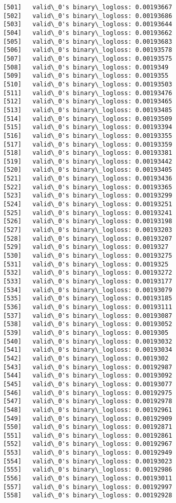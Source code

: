 \documentclass[11pt]{article}
\begin{document}
\begin{Verbatim}[commandchars=\\\{\}]
[501]	valid\_0's binary\_logloss: 0.00193667
[502]	valid\_0's binary\_logloss: 0.00193686
[503]	valid\_0's binary\_logloss: 0.00193644
[504]	valid\_0's binary\_logloss: 0.00193662
[505]	valid\_0's binary\_logloss: 0.00193683
[506]	valid\_0's binary\_logloss: 0.00193578
[507]	valid\_0's binary\_logloss: 0.00193575
[508]	valid\_0's binary\_logloss: 0.0019349
[509]	valid\_0's binary\_logloss: 0.0019355
[510]	valid\_0's binary\_logloss: 0.00193503
[511]	valid\_0's binary\_logloss: 0.00193476
[512]	valid\_0's binary\_logloss: 0.00193465
[513]	valid\_0's binary\_logloss: 0.00193485
[514]	valid\_0's binary\_logloss: 0.00193509
[515]	valid\_0's binary\_logloss: 0.00193394
[516]	valid\_0's binary\_logloss: 0.00193355
[517]	valid\_0's binary\_logloss: 0.00193359
[518]	valid\_0's binary\_logloss: 0.00193381
[519]	valid\_0's binary\_logloss: 0.00193442
[520]	valid\_0's binary\_logloss: 0.00193405
[521]	valid\_0's binary\_logloss: 0.00193436
[522]	valid\_0's binary\_logloss: 0.00193365
[523]	valid\_0's binary\_logloss: 0.00193299
[524]	valid\_0's binary\_logloss: 0.00193251
[525]	valid\_0's binary\_logloss: 0.00193241
[526]	valid\_0's binary\_logloss: 0.00193198
[527]	valid\_0's binary\_logloss: 0.00193203
[528]	valid\_0's binary\_logloss: 0.00193207
[529]	valid\_0's binary\_logloss: 0.0019327
[530]	valid\_0's binary\_logloss: 0.00193275
[531]	valid\_0's binary\_logloss: 0.0019325
[532]	valid\_0's binary\_logloss: 0.00193272
[533]	valid\_0's binary\_logloss: 0.00193177
[534]	valid\_0's binary\_logloss: 0.00193079
[535]	valid\_0's binary\_logloss: 0.00193185
[536]	valid\_0's binary\_logloss: 0.00193111
[537]	valid\_0's binary\_logloss: 0.00193087
[538]	valid\_0's binary\_logloss: 0.00193052
[539]	valid\_0's binary\_logloss: 0.0019305
[540]	valid\_0's binary\_logloss: 0.00193032
[541]	valid\_0's binary\_logloss: 0.00193034
[542]	valid\_0's binary\_logloss: 0.0019302
[543]	valid\_0's binary\_logloss: 0.00192987
[544]	valid\_0's binary\_logloss: 0.00193092
[545]	valid\_0's binary\_logloss: 0.00193077
[546]	valid\_0's binary\_logloss: 0.00192975
[547]	valid\_0's binary\_logloss: 0.00192978
[548]	valid\_0's binary\_logloss: 0.00192961
[549]	valid\_0's binary\_logloss: 0.00192909
[550]	valid\_0's binary\_logloss: 0.00192871
[551]	valid\_0's binary\_logloss: 0.00192861
[552]	valid\_0's binary\_logloss: 0.00192967
[553]	valid\_0's binary\_logloss: 0.00192949
[554]	valid\_0's binary\_logloss: 0.00193023
[555]	valid\_0's binary\_logloss: 0.00192986
[556]	valid\_0's binary\_logloss: 0.00193011
[557]	valid\_0's binary\_logloss: 0.00192997
[558]	valid\_0's binary\_logloss: 0.00192928

\end{Verbatim}
\end{document}
